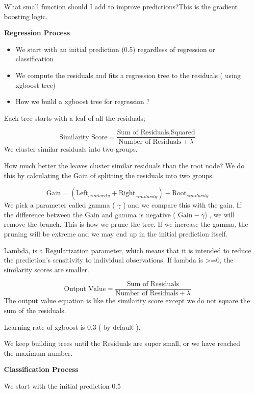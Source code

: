 \documentclass[10pt,a4paper]{article}
\begin{document}
	
		What small function should I add to improve predictions?This is the gradient boosting logic.
	
	
	
		\textbf{Regression Process}
	
		\begin{itemize}
			\item We start with an initial prediction (0.5) regardless of regression or classification
			\item We compute the residuals and fits a regression tree to the residuals  ( using xgboost tree)
			\item How we build a xgboost tree for regression ?
		\end{itemize}
	
		Each tree starts with a leaf of all the residuals;
	
		$$	\text{Similarity Score} = \frac{\text{Sum of Residuals,Squared}}{\text{Number of Residuals}+\lambda}
		$$
		We cluster similar residuals into two groups.
	
		How much better the leaves cluster similar residuals than the root node? We do this by calculating the Gain of splitting the residuals into two groups.
	
		$$	\text{Gain} = (\text{Left}_{similarity} + \text{Right}_{similarity}) - \text{Root}_{similarity}
		$$
		We pick a parameter called gamma ( $\gamma$ ) and we compare this with the gain. If the difference between the Gain and gamma is negative ( $\text{Gain}-\gamma$) , we will remove the branch. This is how we prune the tree. If we increase the gamma, the pruning will be extreme and we may end up in the initial prediction itself.
	
		Lambda, is a Regularization parameter, which means that it is intended to reduce the prediction’s sensitivity to individual observations. If lambda is >=0, the similarity scores are smaller.
	
		$$	\text{Output Value} = \frac{\text{Sum of Residuals}}{\text{Number of Residuals}+\lambda}
		$$
		The output value equation is like the similarity score except we do not square the sum of the residuals.
	
		Learning rate of xgboost is 0.3 ( by default ).
	
		We keep building trees until the Residuals are super small, or we have reached the maximum number.
	
		\textbf{ Classification Process}
	
		We start with the initial prediction 0.5
	
\end{document}
